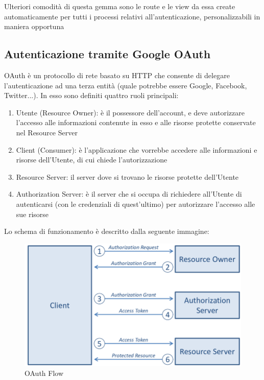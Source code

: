 \documentclass[Lau, binding=0.6cm]{sapthesis}
\begin{document}
Ulteriori comodità di questa gemma sono le route e le view da essa create automaticamente per tutti i processi relativi all’autenticazione, personalizzabili in maniera opportuna

\subsection{Autenticazione tramite Google OAuth}

OAuth è un protocollo di rete basato su HTTP che consente di delegare l’autenticazione ad una terza entità (quale potrebbe essere Google, Facebook, Twitter...). In esso sono definiti quattro ruoli principali:

\begin{enumerate}
	\item Utente (Resource Owner): è il possessore dell’account, e deve autorizzare l’accesso alle informazioni contenute in esso e alle risorse protette conservate nel Resource Server
	\item Client (Consumer): è l’applicazione che vorrebbe accedere alle informazioni e risorse dell’Utente, di cui chiede l’autorizzazione
	\item Resource Server: il server dove si trovano le risorse protette dell’Utente
	\item Authorization Server: è il server che si occupa di richiedere all’Utente di autenticarsi (con le credenziali di quest’ultimo) per autorizzare l’accesso alle sue risorse
\end{enumerate}

Lo schema di funzionamento è descritto dalla seguente immagine:\\

\begin{figure}[H]
	\centering
	\includegraphics[width=0.90\linewidth]{images/oauth}
	\caption{OAuth Flow}
	\label{fig:oauth}
\end{figure}
\end{document}
